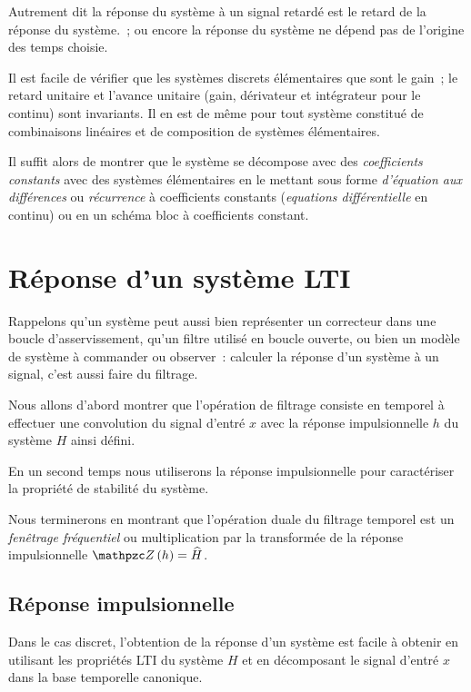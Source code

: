 Autrement dit \og{}la réponse du système à un signal retardé est le
retard de la réponse du système.\fg{}~; ou encore \og{} la réponse du
système ne dépend pas de l'origine des temps choisie.\fg{}



\begin{remarque}
  Il est facile de vérifier que les systèmes discrets élémentaires que
  sont le gain~; le retard unitaire et l'avance unitaire (gain,
  dérivateur et intégrateur pour le continu) sont invariants.  Il en
  est de même pour tout système constitué de combinaisons linéaires et
  de composition de systèmes élémentaires.
  
  Il suffit alors de montrer que le système se décompose avec des
  \emph{coefficients constants} avec des systèmes élémentaires en le
  mettant sous forme \emph{d'équation aux différences} ou
  \emph{récurrence} à coefficients constants (\emph{equations
    différentielle} en continu) ou en un schéma bloc à coefficients
  constant.
\end{remarque}


\section{Réponse d'un système LTI}
Rappelons qu'un système peut aussi bien représenter un correcteur dans
une boucle d'asservissement, qu'un filtre utilisé en boucle ouverte,
ou bien un modèle de système à commander ou observer~: calculer la
réponse d'un système à un signal, c'est aussi \og{}faire du
filtrage.\fg{}

Nous allons d'abord montrer que l'opération de filtrage consiste en
temporel à effectuer une convolution du signal d'entré $x$ avec la
réponse impulsionnelle $h$ du système $H$ ainsi défini.

En un second temps nous utiliserons la réponse impulsionnelle pour
caractériser la propriété de stabilité du système.

Nous terminerons en montrant que l'opération duale du filtrage
temporel est un \emph{fenêtrage fréquentiel} ou multiplication par la
transformée de la réponse impulsionnelle $\TZ\p{h}=\TZlui{H}$.

\subsection{Réponse impulsionnelle}
Dans le cas discret, l'obtention de la réponse d'un système est facile
à obtenir en utilisant les propriétés LTI du système $H$ et en
décomposant le signal d'entré $x$ dans la base temporelle canonique.


